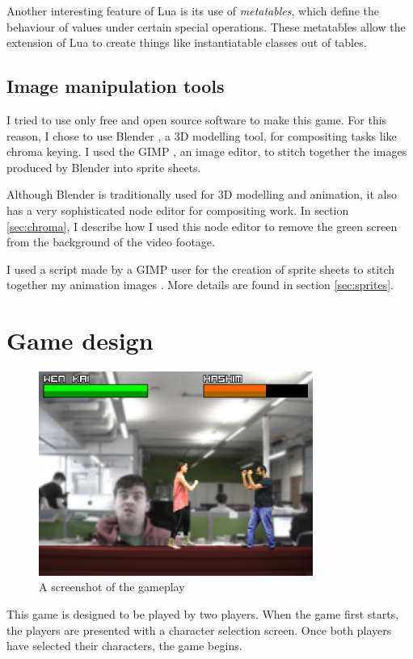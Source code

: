 \documentclass[11pt]{article}
\begin{document}
Another interesting feature of Lua is its use of \emph{metatables}, which define the behaviour of values under certain special operations. These metatables allow the extension of Lua to create things like instantiatable classes out of tables.

\subsection{Image manipulation tools}
I tried to use only free and open source software to make this game. For this reason, I chose to use Blender \cite{blender}, a 3D modelling tool, for compositing tasks like chroma keying. I used the GIMP \cite{gimp}, an image editor, to stitch together the images produced by Blender into sprite sheets.

Although Blender is traditionally used for 3D modelling and animation, it also has a very sophisticated node editor for compositing work. In section \ref{sec:chroma}, I describe how I used this node editor to remove the green screen from the background of the video footage.

I used a script made by a GIMP user for the creation of sprite sheets to stitch together my animation images \cite{gimpscript}. More details are found in section \ref{sec:sprites}.

\section{Game design}
\begin{figure}[tp]
\centering
\includegraphics[width=0.8\textwidth]{screenshot.png}
\caption{A screenshot of the gameplay}
\label{fig:screenshot}
\end{figure}

This game is designed to be played by two players. When the game first starts, the players are presented with a character selection screen. Once both players have selected their characters, the game begins.
\end{document}
